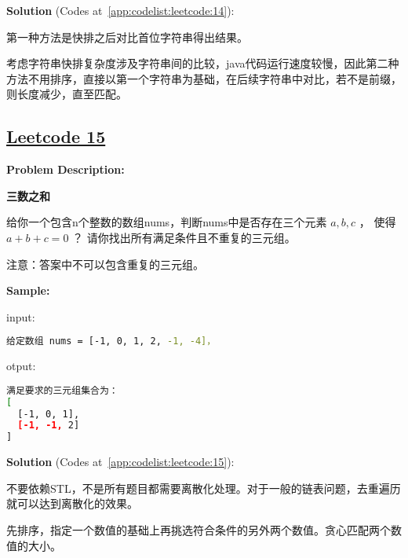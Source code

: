 \textbf{Solution }(Codes at~\ref{app:codelist:leetcode:14}):\par

第一种方法是快排之后对比首位字符串得出结果。\par

考虑字符串快排复杂度涉及字符串间的比较，java代码运行速度较慢，因此第二种方法不用排序，直接以第一个字符串为基础，在后续字符串中对比，若不是前缀，则长度减少，直至匹配。\par



\subsection{\href{https://leetcode-cn.com/}{Leetcode 15}}\label{app:problemlist:leetcode:15}

\textbf{Problem Description:}\par

\textbf{三数之和}\par

给你一个包含n个整数的数组nums，判断nums中是否存在三个元素 $ a, b, c $ ，
使得 $ a + b + c = 0 $ ？
请你找出所有满足条件且不重复的三元组。\par

注意：答案中不可以包含重复的三元组。\par


\textbf{Sample:}\par

input:\par

\begin{lstlisting}[language=bash]
给定数组 nums = [-1, 0, 1, 2, -1, -4]，
\end{lstlisting}

otput:\par

\begin{lstlisting}[language=bash]
满足要求的三元组集合为：
[
  [-1, 0, 1],
  [-1, -1, 2]
]
\end{lstlisting}

\textbf{Solution }(Codes at~\ref{app:codelist:leetcode:15}):\par

不要依赖STL，不是所有题目都需要离散化处理。对于一般的链表问题，去重遍历就可以达到离散化的效果。\par

先排序，指定一个数值的基础上再挑选符合条件的另外两个数值。贪心匹配两个数值的大小。\par



